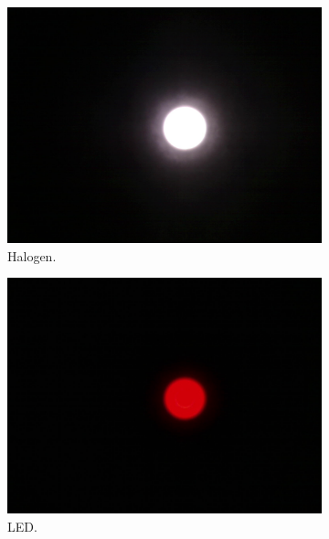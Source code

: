 \documentclass[a4paper, 12pt]{paper}
\begin{document}
\begin{figure}[H]
    \centering
    \begin{subfigure}[b]{0.30\textwidth}
        \includegraphics[width=\textwidth]{img/halogen-injection.jpg}
        \caption{Halogen.}
    \end{subfigure}
    \begin{subfigure}[b]{0.30\textwidth}
        \includegraphics[width=\textwidth]{img/efficiency-45mm.jpg}
        \caption{LED.}
    \end{subfigure}
    \begin{subfigure}[b]{0.30\textwidth}

\end{subfigure}
\end{figure}
\end{document}
